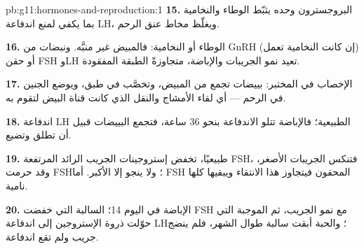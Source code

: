 \begin{solution}{pb:g11:hormones-and-reproduction:1}
\textbf{15.} البروجسترون وحده يثبّط الوطاء والنخامية بما يكفي لمنع
اندفاعة LH، ويغلّظ مخاط عنق الرحم.

\textbf{16.} الوطاء أو النخامية: فالمبيض غير منبَّه. ونبضات من GnRH
(إن كانت النخامية تعمل) أو حقن FSH وLH تعيد نمو الجريبات والإباضة،
متجاوزةً الطبقة المفقودة.

\textbf{17.} الإخصاب في المختبر: بييضات تجمع من المبيض، وتخصَّب في
طبق، ويوضع الجنين في الرحم --- أي لقاء الأمشاج والنقل الذي كانت قناة
البيض لتقوم به.

\textbf{18.} اندفاعة LH الطبيعية؛ فالإباضة تتلو الاندفاعة بنحو 36
ساعة، فتجمع البييضات قبيل أن تطلق وتضيع.

\textbf{19.} طبيعيًا، تخفض إستروجينات الجريب الرائد المرتفعة FSH،
فتنكس الجريبات الأصغر، وقد حرمت FSH؛ ولا ينجو إلا الأكبر. أما FSH
المحقون فيتجاوز هذا الانتقاء ويبقيها كلها نامية.

\textbf{20.} الإباضة في اليوم 14؛  السالبة التي خفضت
FSH مع نمو الجريب، ثم  الموجبة التي حوّلت ذروة
الإستروجين إلى اندفاعة LH؛ والحبة أبقت  سالبة طوال
الشهر، فلم ينضج جريب ولم تقع اندفاعة.
\end{solution}
